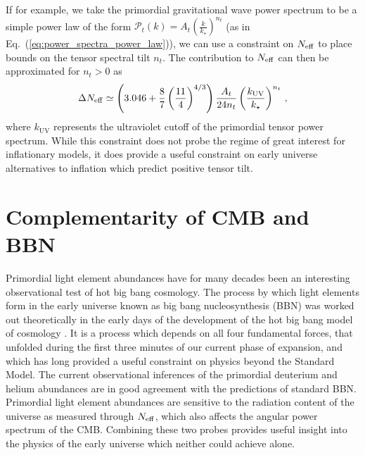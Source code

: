 If for example, we take the primordial gravitational wave power spectrum to be a simple power law of the form $\mathcal{P}_t(k) = A_t \left(\frac{k}{k_\star}\right)^{n_t}$ (as in Eq.~(\ref{eq:power_spectra_power_law})), we can use a constraint on $N_{\rm eff}$ to place bounds on the tensor spectral tilt $n_t$.  The contribution to $N_{\rm eff}$ can then be approximated for $n_t>0$ as \cite{Meerburg:2015zua}
\begin{equation}\label{eq:Neff_GW}
	\Delta N_{\rm eff} \simeq \left(3.046 + \frac{8}{7}\left(\frac{11}{4}\right)^{4/3}\right)\frac{A_t}{24n_t}\left(\frac{k_\mathrm{UV}}{k_\star}\right)^{n_t} \, ,
\end{equation}
where $k_\mathrm{UV}$ represents the ultraviolet cutoff of the primordial tensor power spectrum.  While this constraint does not probe the regime of great interest for inflationary models, it does provide a useful constraint on early universe alternatives to inflation which predict positive tensor tilt.



\section{Complementarity of CMB and BBN}\label{sec:bbn}


Primordial light element abundances have for many decades been an interesting observational test of hot big bang cosmology.  The process by which light elements form in the early universe known as big bang nucleosynthesis (BBN) was worked out theoretically in the early days of the development of the hot big bang model of cosmology \cite{Alpher:1948ve}.  It is a process which depends on all four fundamental forces, that unfolded during the first three minutes of our current phase of expansion, and which has long provided a useful constraint on physics beyond the Standard Model.  The current observational inferences of the primordial deuterium and helium abundances are in good agreement with the predictions of standard BBN.  Primordial light element abundances are sensitive to the radiation content of the universe as measured through $N_{\rm eff}$, which also affects the angular power spectrum of the CMB.  Combining these two probes provides useful insight into the physics of the early universe which neither could achieve alone.

